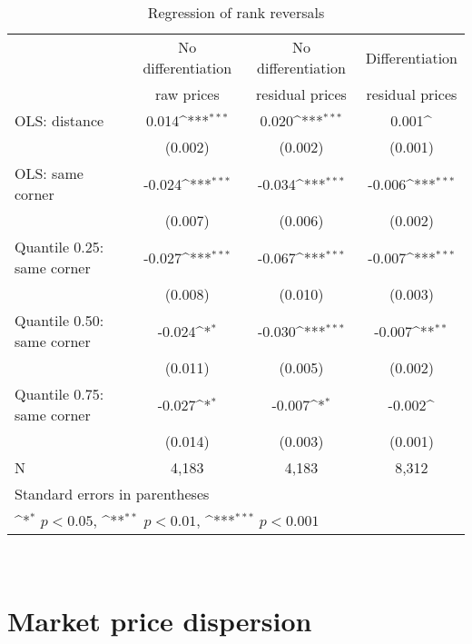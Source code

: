 \documentclass[english]{article}
\begin{document}
{\begin{table}[H]
\centering
\def\sym#1{\ifmmode^{#1}\else\(^{#1}\)\fi}
\caption{Regression of rank reversals}
\begin{tabular}{lccc}
\hline
\hline
{} & No differentiation & No differentiation & Differentiation \\
{} & raw prices & residual prices & residual prices \\
\hline
OLS: distance             &  0.014\sym{***}  &  0.020\sym{***}  &  0.001\sym{}\\
{}                        & (0.002)          & (0.002)          & (0.001)   \\
OLS: same corner                & -0.024\sym{***}  & -0.034\sym{***}  & -0.006\sym{***}\\
{}                        & (0.007)          & (0.006)          & (0.002) \\
Quantile 0.25: same corner      & -0.027\sym{***}  & -0.067\sym{***}  & -0.007\sym{***}\\
{}                        & (0.008)          & (0.010)          & (0.003)  \\
Quantile 0.50: same corner      & -0.024\sym{*}    & -0.030\sym{***}  & -0.007\sym{**}\\
{}                        & (0.011)          & (0.005)          & (0.002)    \\
Quantile 0.75: same corner      & -0.027\sym{*}    & -0.007\sym{*}    & -0.002\sym{}\\
{}                        & (0.014)          & (0.003)          & (0.001)   \\
\hline
N                         & 4,183            &   4,183          &     8,312    \\
\hline\hline
\multicolumn{4}{l}{\footnotesize Standard errors in parentheses}\\
\multicolumn{4}{l}{\footnotesize \sym{*} \(p<0.05\), \sym{**} \(p<0.01\), \sym{***} \(p<0.001\)}\\
\end{tabular}
\\
\end{table}

\section{Market price dispersion}

}
\end{document}
